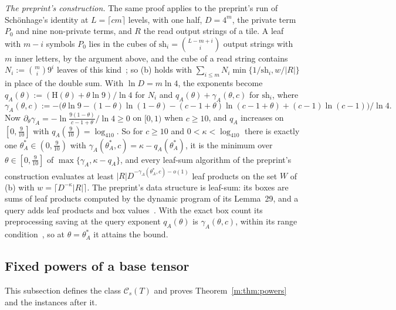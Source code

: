 \documentclass[11pt]{article}
\theoremstyle{definition}
\theoremstyle{remark}
\newcommand{\Hh}{\mathrm{H}}
\begin{document}
\emph{The preprint's construction.} The same proof applies to the preprint's run of Schönhage's identity at $L=\lceil cm\rceil$ levels, with one half, $D=4^m$, the private term $P_0$ and nine non-private terms, and $R$ the read output strings of a tile. A leaf with $m-i$ symbols $P_0$ lies in the cubes of $\mathrm{sh}_i=\binom{L-m+i}i$ output strings with $m$ inner letters, by the argument above, and the cube of a read string contains $N_i:=\binom mi9^i$ leaves of this kind~\cite[Section~2.4.3]{ZT}; so (b) holds with $\sum_{i\le m}N_i\min\{1/\mathrm{sh}_i,w/|R|\}$ in place of the double sum. With $\ln D=m\ln4$, the exponents become $q_A(\theta):=(\Hh(\theta)+\theta\ln9)/\ln4$ for $N_i$ and $q_A(\theta)+\gamma_A(\theta,c)$ for $\mathrm{sh}_i$, where
\[
\gamma_A(\theta,c):=-\big(\theta\ln9-(1-\theta)\ln(1-\theta)-(c-1+\theta)\ln(c-1+\theta)+(c-1)\ln(c-1)\big)/\ln4 .
\]
Now $\partial_\theta\gamma_A=-\ln\frac{9(1-\theta)}{c-1+\theta}/\ln4\ge0$ on $[0,1)$ when $c\ge10$, and $q_A$ increases on $[0,\frac9{10}]$ with $q_A(\frac9{10})=\log_410$. So for $c\ge10$ and $0<\kappa<\log_410$ there is exactly one $\theta^*_A\in(0,\frac9{10})$ with $\gamma_A(\theta^*_A,c)=\kappa-q_A(\theta^*_A)$, it is the minimum over $\theta\in[0,\frac9{10}]$ of $\max\{\gamma_A,\kappa-q_A\}$, and every leaf-sum algorithm of the preprint's construction evaluates at least $|R|D^{-\gamma_A(\theta^*_A,c)-o(1)}$ leaf products on the set $W$ of (b) with $w=\lceil D^{-\kappa}|R|\rceil$. The preprint's data structure is leaf-sum: its boxes are sums of leaf products computed by the dynamic program of its Lemma~29, and a query adds leaf products and box values~\cite[Sections~4.2--4.4]{ZT}. With the exact box count its preprocessing saving at the query exponent $q_A(\theta)$ is $\gamma_A(\theta,c)$, within its range condition~\cite[Theorem~2]{Shr26}, so at $\theta=\theta^*_A$ it attains the bound.

\subsection{Fixed powers of a base tensor}\label{a:sec:powers}

This subsection defines the class $\mathcal C_s(T)$ and proves Theorem~\ref{m:thm:powers} and the instances after it.
\end{document}
